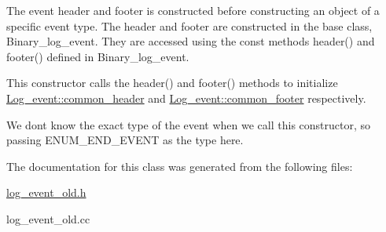 The event header and footer is constructed before constructing an object of a specific event type. The header and footer are constructed in the base class, Binary\+\_\+log\+\_\+event. They are accessed using the const methods header() and footer() defined in Binary\+\_\+log\+\_\+event.

This constructor calls the header() and footer() methods to initialize \mbox{\hyperlink{classLog__event_ac9c5b6494544de6b569351b919f75d57}{Log\+\_\+event\+::common\+\_\+header}} and \mbox{\hyperlink{classLog__event_a1280a16e7f198401154ea83667b9d0d7}{Log\+\_\+event\+::common\+\_\+footer}} respectively.

We don\textquotesingle{}t know the exact type of the event when we call this constructor, so passing E\+N\+U\+M\+\_\+\+E\+N\+D\+\_\+\+E\+V\+E\+NT as the type here. 

The documentation for this class was generated from the following files\+:\begin{DoxyCompactItemize}
\item 
\mbox{\hyperlink{log__event__old_8h}{log\+\_\+event\+\_\+old.\+h}}\item 
log\+\_\+event\+\_\+old.\+cc\end{DoxyCompactItemize}
